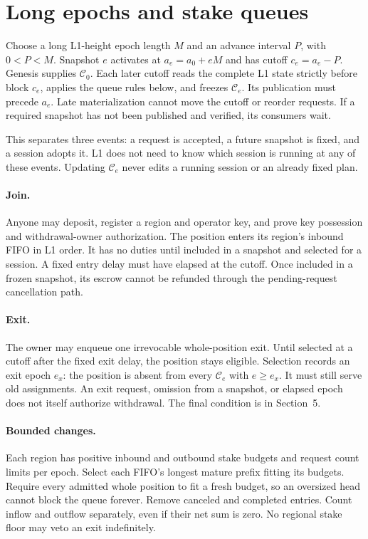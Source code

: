 \documentclass[11pt,a4paper]{article}
\newcommand{\cfg}{\mathcal C}
\begin{document}
\newpage
\section{Long epochs and stake queues}
\label{sec:queues}
Choose a long L1-height epoch length $M$ and an advance interval $P$,
with $0<P<M$. Snapshot $e$ activates at $a_e=a_0+eM$ and has cutoff
$c_e=a_e-P$. Genesis supplies $\cfg_0$. Each later cutoff reads the
complete L1 state strictly before block $c_e$, applies the queue rules
below, and freezes $\cfg_e$. Its publication must precede $a_e$.
Late materialization cannot move the cutoff or reorder requests. If a
required snapshot has not been published and verified, its consumers wait.

This separates three events: a request is accepted, a future snapshot is
fixed, and a session adopts it. L1 does not need to know which session is
running at any of these events. Updating $\cfg_e$ never edits a running
session or an already fixed plan.

\paragraph{Join.}
Anyone may deposit, register a region and operator key, and prove key
possession and withdrawal-owner authorization. The position enters its
region's inbound FIFO in L1 order. It has no duties until included in a
snapshot and selected for a session. A fixed entry delay must have elapsed
at the cutoff. Once included in a frozen snapshot, its escrow cannot be
refunded through the pending-request cancellation path.

\paragraph{Exit.}
The owner may enqueue one irrevocable whole-position exit. Until selected
at a cutoff after the fixed exit delay, the position stays eligible.
Selection records an exit epoch $e_x$: the position is absent from every
$\cfg_e$ with $e\ge e_x$. It must still serve old assignments. An exit
request, omission from a snapshot, or elapsed epoch does not itself
authorize withdrawal. The final condition is in Section~5.

\paragraph{Bounded changes.}
Each region has positive inbound and outbound stake budgets and request
count limits per epoch. Select each FIFO's longest mature prefix fitting
its budgets. Require every admitted whole position to fit a fresh budget,
so an oversized head cannot block the queue forever. Remove canceled and
completed entries. Count inflow and outflow separately, even if their net
sum is zero. No regional stake floor may veto an exit indefinitely.
\end{document}
